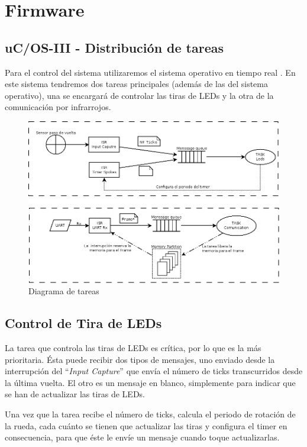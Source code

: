 \section{Firmware}
\subsection{uC/OS-III - Distribución de tareas}
Para el control del sistema utilizaremos el sistema operativo en tiempo real
\uCOS . En este sistema tendremos dos tareas principales (además de las
del sistema operativo), una se encargará de controlar las tiras de LEDs y la
otra de la comunicación por infrarrojos.

\begin{figure}[!ht]
	\centering

	\includegraphics[width=\textwidth]{images/tareas}

	\caption{Diagrama de tareas}
	\label{fig:tareas}
\end{figure}

\subsection{Control de Tira de LEDs}
La tarea que controla las tiras de LEDs es crítica, por lo que es la más
prioritaria. Ésta puede recibir dos tipos de mensajes, uno enviado desde la
interrupción del ``\textsl{Input Capture}'' que envía el número de ticks
transcurridos desde la última vuelta. El otro es un mensaje en blanco,
simplemente para indicar que se han de actualizar las tiras de LEDs.

Una vez que la tarea recibe el número de ticks, calcula el periodo de rotación
de la rueda, cada cuánto se tienen que actualizar las tiras y configura el timer
en consecuencia, para que éste le envíe un mensaje cuando toque actualizarlas.

